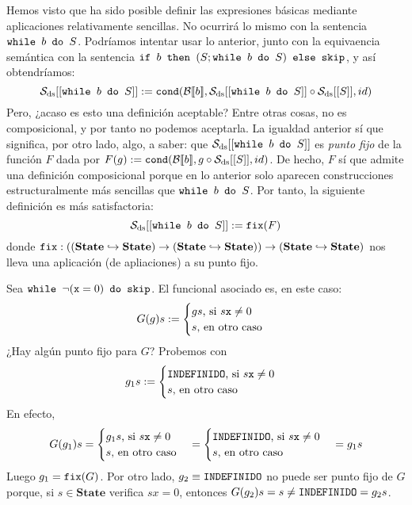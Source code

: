 Hemos visto que ha sido posible definir las expresiones básicas mediante aplicaciones relativamente sencillas. No ocurrirá lo mismo con la sentencia $\texttt{while } b \texttt{ do } S$. Podríamos intentar usar lo anterior, junto con la equivaencia semántica con la sentencia $\texttt{if }b\texttt{ then }(S; \texttt{while }b\texttt{ do }S)\texttt{ else skip}$, y así obtendríamos:
$$\mathcal{S}_{\mathrm{ds}}[[\texttt{while } b \texttt{ do } S]] := \texttt{cond}(\mathcal{B}[\![b]\!], \mathcal{S}_{\mathrm{ds}}[[\texttt{while }b\texttt{ do }S]]\circ \mathcal{S}_{\mathrm{ds}}[[S]], id)$$
Pero, ¿acaso es esto una definición aceptable? Entre otras cosas, no es composicional, y por tanto no podemos aceptarla. La igualdad anterior sí que significa, por otro lado, algo, a saber: que $\mathcal{S}_{\mathrm{ds}}[[\texttt{while } b \texttt{ do } S]]$ es \textit{punto fijo} de la función $F$ dada por $F(g) := \texttt{cond}(\mathcal{B}[\![b]\!], g\circ \mathcal{S}_{\mathrm{ds}}[[S]], id)$. De hecho, $F$ sí que admite una definición composicional porque en lo anterior solo aparecen construcciones estructuralmente más sencillas que $\texttt{while } b \texttt{ do } S$. Por tanto, la siguiente definición es más satisfactoria:
$$\mathcal{S}_{\mathrm{ds}}[[\texttt{while } b \texttt{ do } S]] := \texttt{fix}(F)$$
donde $\texttt{fix}: ((\mathbf{State}\hookrightarrow \mathbf{State})\to (\mathbf{State}\hookrightarrow \mathbf{State}))\to (\mathbf{State}\hookrightarrow \mathbf{State})$ nos lleva una aplicación (de apliaciones) a su punto fijo. 

\begin{example}
Sea $\texttt{while } \neg(\texttt{x} = 0)\texttt{ do skip}$. El funcional asociado es, en este caso:
$$G(g)s := \begin{cases}
    gs \text{, si } s\texttt{x} \neq 0\\
    s \text{, en otro caso}
\end{cases}$$
¿Hay algún punto fijo para $G$? Probemos con 
$$g_1s := \begin{cases}
    \texttt{INDEFINIDO} \text{, si } s\texttt{x}\neq 0 \\
    s \text{, en otro caso}
\end{cases}$$
En efecto, 
$$G(g_1)s = \begin{cases}
    g_1s \text{, si } s\texttt{x} \neq 0\\
    s \text{, en otro caso}
\end{cases} = \begin{cases}
    \texttt{INDEFINIDO} \text{, si } s\texttt{x}\neq 0 \\
    s \text{, en otro caso}
\end{cases} = g_1s$$
Luego $g_1 = \texttt{fix}(G)$. Por otro lado, $g_2 \equiv \texttt{INDEFINIDO}$ no puede ser punto fijo de $G$ porque, si $s \in \mathbf{State}$ verifica $sx = 0$, entonces $G(g_2)s = s \neq \texttt{INDEFINIDO} = g_2s$.
\end{example}



